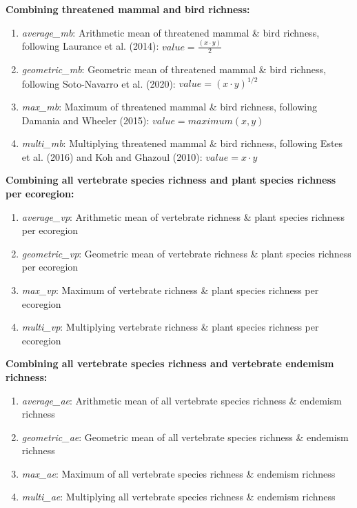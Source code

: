 \documentclass[
]{article}
\providecommand{\tightlist}{%
  \setlength{\itemsep}{0pt}\setlength{\parskip}{0pt}}
\begin{document}
\newpage

\textbf{Combining threatened mammal and bird richness:}

\begin{enumerate}
\def\labelenumi{(\arabic{enumi})}
\setcounter{enumi}{24}
\tightlist
\item
  \emph{average\_mb}: Arithmetic mean of threatened mammal \& bird richness, following Laurance et al. (2014): \(value = \frac{(x \cdot y)}{2}\)
\item
  \emph{geometric\_mb}: Geometric mean of threatened mammal \& bird richness, following Soto-Navarro et al. (2020): \(value = (x \cdot y)^{1/2}\)
\item
  \emph{max\_mb}: Maximum of threatened mammal \& bird richness, following Damania and Wheeler (2015): \(value = maximum (x,y)\)
\item
  \emph{multi\_mb}: Multiplying threatened mammal \& bird richness, following Estes et al. (2016) and Koh and Ghazoul (2010): \(value = x \cdot y\)
\end{enumerate}

\textbf{Combining all vertebrate species richness and plant species richness per ecoregion:}

\begin{enumerate}
\def\labelenumi{(\arabic{enumi})}
\setcounter{enumi}{28}
\tightlist
\item
  \emph{average\_vp}: Arithmetic mean of vertebrate richness \& plant species richness per ecoregion
\item
  \emph{geometric\_vp}: Geometric mean of vertebrate richness \& plant species richness per ecoregion
\item
  \emph{max\_vp}: Maximum of vertebrate richness \& plant species richness per ecoregion
\item
  \emph{multi\_vp}: Multiplying vertebrate richness \& plant species richness per ecoregion
\end{enumerate}

\textbf{Combining all vertebrate species richness and vertebrate endemism richness:}

\begin{enumerate}
\def\labelenumi{(\arabic{enumi})}
\setcounter{enumi}{32}
\tightlist
\item
  \emph{average\_ae}: Arithmetic mean of all vertebrate species richness \& endemism richness
\item
  \emph{geometric\_ae}: Geometric mean of all vertebrate species richness \& endemism richness
\item
  \emph{max\_ae}: Maximum of all vertebrate species richness \& endemism richness
\item
  \emph{multi\_ae}: Multiplying all vertebrate species richness \& endemism richness
\end{enumerate}
\end{document}

